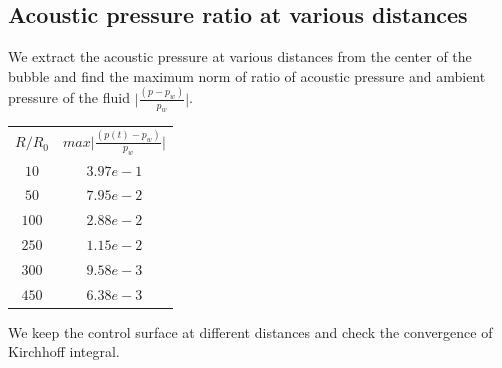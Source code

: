 \documentclass[a4paper]{article}
\begin{document}
\subsection*{Acoustic pressure ratio at various distances}
We extract the acoustic pressure at various distances from the center of the bubble and find the maximum norm of ratio of acoustic pressure and ambient pressure of the fluid $\Big|\frac{(p - p_w)}{p_w} \Big |$.
\begin{table}[h!]
    \begin{tabular}{c c}
        $R/R_0$ & $max \Big|\frac{(p(t) - p_w)}{p_w} \Big |$ \\
        $10$ & $3.97e-1$ \\
        $50$ & $7.95e-2$ \\
        $100$ & $2.88e-2$ \\
        $250$ & $1.15e-2$ \\ 
        $300$ & $9.58e-3$ \\
        $450$ & $6.38e-3$ \\
    \end{tabular}
\end{table}
We keep the control surface at different distances and check the convergence of Kirchhoff integral.
\end{document}
